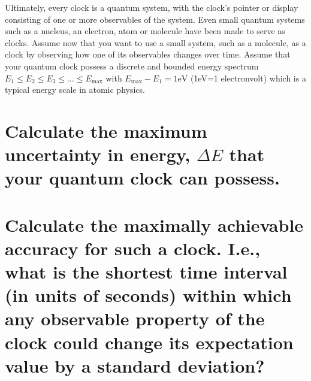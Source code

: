 \documentclass[boxes,pages]{homework}
\makeatletter
\numberwithin{@problem}{section}
\makeatother
\begin{document}
\begin{solution}
	\begin{figure}[h!]
		\centering
	\end{figure}
\end{solution}


\begin{problem}
Ultimately, every clock is a quantum system, with the clock's pointer or display consisting of one or more observables of the system. Even small quantum systems such as a nucleus, an electron, atom or molecule have been made to serve as clocks. Assume now that you want to use a small system, such as a molecule, as a clock by observing how one of its observables changes over time. Assume that your quantum clock possess a discrete and bounded energy spectrum $E_1\leq E_2\leq E_3\leq\ldots\leq E_\text{max}$ with $E_\text{max} - E_1 = 1\text{eV}$ (1eV=1 electronvolt) which is a typical energy scale in atomic physics.
\begin{parts}
	\part{Calculate the maximum uncertainty in energy, $\Delta E$ that your quantum clock can possess.}\label{part:clocka}
	\part{Calculate the maximally achievable accuracy for such a clock. I.e., what is the shortest time interval (in units of seconds) within which any observable property of the clock could change its expectation value by a standard deviation?}\label{part:clockb}
\end{parts}
\end{problem}
\end{document}
